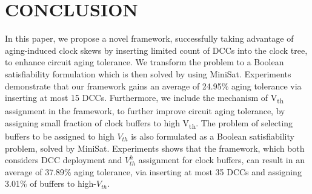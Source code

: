 \section{CONCLUSION}
\label{sec:conclude}
In this paper, we propose a novel framework, successfully taking advantage of aging-induced clock skews by inserting limited count of DCCs into the clock tree, to enhance circuit aging tolerance. We transform the problem to a Boolean satisfiability formulation which is then solved by using MiniSat. Experiments demonstrate that our framework gains an average of 24.95\% aging tolerance via inserting at most 15 DCCs. Furthermore, we include the mechanism of V\textsubscript{th} assignment in the framework, to further improve circuit aging tolerance, by assigning small fraction of clock buffers to high V\textsubscript{th}. The problem of selecting buffers to be assigned to high $V_{th}$ is also formulated as a Boolean satisfiability problem, solved by MiniSat. Experiments shows that the framework, which both considers DCC deployment and $V_{th}^h$ assignment for clock buffers, can result in an average of 37.89\% aging tolerance, via inserting at most 35 DCCs and assigning 3.01\% of buffers to high-$V_{th}$.



